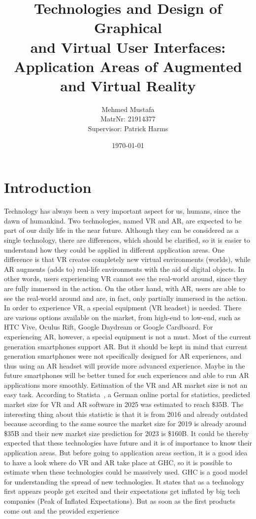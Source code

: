 \documentclass[12pt]{article}
\title{Technologies and Design of Graphical \\ 
and Virtual User Interfaces: \\
Application Areas of Augmented and Virtual Reality}
\date{\today}
\author{Mehmed Mustafa \\
		MatrNr: 21914377 \\
		Supervisor: Patrick Harms}
\begin{document}
\maketitle
\thispagestyle{empty}
\newpage
\tableofcontents
\newpage


\section{Introduction} \label{sec:Introduction}
Technology has always been a very important aspect for us, humans, since the dawn of humankind. Two technologies, named \ac{VR} and \ac{AR}, are expected to be part of our daily life in the near future. Although they can be considered as a single technology, there are differences, which should be clarified, so it is easier to understand how they could be applied in different application areas. One difference is that \ac{VR} creates completely new virtual environments (worlds), while \ac{AR} augments (adds to) real-life environments with the aid of digital objects. In other words, users experiencing \ac{VR} cannot see the real-world around, since they are fully immersed in the action. On the other hand, with \ac{AR}, users are able to see the real-world around and are, in fact, only partially immersed in the action. In order to experience \ac{VR}, a special equipment (\ac{VR} headset) is needed. There are various options available on the market, from high-end to low-end, such as HTC Vive, Oculus Rift, Google Daydream or Google Cardboard. For experiencing \ac{AR}, however, a special equipment is not a must. Most of the current generation smartphones support \ac{AR}.  But it should be kept in mind that current generation smartphones were not specifically designed for \ac{AR} experiences, and thus using an \ac{AR} headset will provide more advanced experience. Maybe in the future smartphones will be better tuned for such experiences and able to run \ac{AR} applications more smoothly. Estimation of the \ac{VR} and \ac{AR} market size is not an easy task. According to Statista~\cite{statista}, a German online portal for statistics, predicted market size for \ac{VR} and \ac{AR} software in 2025 was estimated to reach \$35B. The interesting thing about this statistic is that it is from 2016 and already outdated because according to the same source the market size for 2019 is already around \$35B and their new market size prediction for 2023 is \$160B. It could be thereby expected that these technologies have future and it is of importance to know their application areas. But before going to application areas section, it is a good idea to have a look where do \ac{VR} and \ac{AR} take place at \ac{GHC}, so it is possible to estimate when these technologies could be massively used. \ac{GHC} is a good model for understanding the spread of new technologies. It states that as a technology first appears people get excited and their expectations get inflated by big tech companies (Peak of Inflated Expectations). But as soon as the first products come out and the provided experience 
\end{document}
